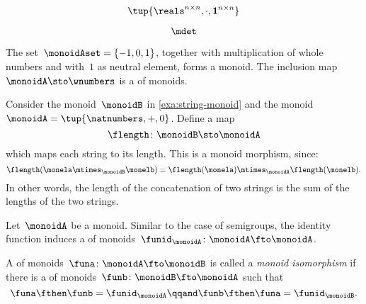{\begin{forslides}
        \begin{equation}
            \label{eq:matrices-times}
            \tup{\reals^{n\times n}, \cdot, \mathbf{1}^{n\times n}}
        \end{equation}
        
        \begin{equation}
            \label{eq:det}
            \mdet
        \end{equation}
    \end{forslides}
}%

\begin{example}
    The set~$\monoidAset = \{ -1, 0, 1 \}$, together with multiplication of whole numbers and with~$1$ as neutral element, forms a monoid.
    The inclusion map~$\monoidA \sto \wnumbers$ is a \whomo of monoids.
\end{example}

\begin{example}
    \label{exa:string-length}
    Consider the monoid~$\monoidB$ in \cref{exa:string-monoid} and the monoid~$\monoidA=\tup{\natnumbers, +,0}$.
    Define a map
    \begin{equation*}
        \flength \colon \monoidB \sto \monoidA
    \end{equation*}
    which maps each string to its length.
This is a monoid morphism, since:
    \begin{equation*}
        \flength(\monela \mtimes_\monoidB \monelb)=\flength(\monela)\mtimes_\monoidA \flength(\monelb).
    \end{equation*}
    In other words, the length of the concatenation of two strings is the sum of the lengths of the two strings.
\end{example}

\begin{definition}
    \label{def:identity-mon-mor}
    Let~$\monoidA$ be a monoid.
Similar to the case of semigroups, the identity function induces a \whomo of monoids~$\funid_\monoidA\colon \monoidA \fto \monoidA$.
\end{definition}



\begin{definition}
    \label{def:monoid-iso}
    A \whomo of monoids~$\funa\colon \monoidA \fto \monoidB$ is called a \emph{monoid isomorphism} if there is a \whomo of monoids~$\funb\colon \monoidB \fto \monoidA$ such that
    \begin{equation}
        \funa \fthen \funb = \funid_\monoidA \qqand \funb \fthen \funa = \funid_\monoidB.
    \end{equation}
\end{definition}


